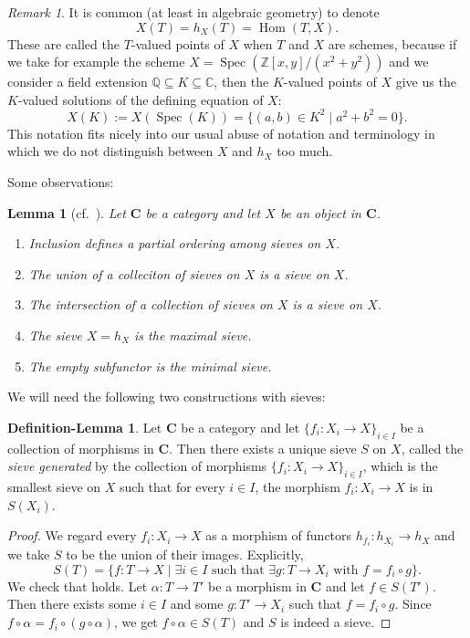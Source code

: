 \documentclass[12pt,reqno,a4paper]{amsart}
\theoremstyle{plain}
\newtheorem{lm}[thm]{Lemma}
\theoremstyle{definition}
\newtheorem{defnlm}[thm]{Definition-Lemma}
\theoremstyle{remark}
\newtheorem{rem}[thm]{Remark}
\begin{document}
\begin{rem}
  It is common (at least in algebraic geometry) to denote
  \[ X(T) = h_{X}(T) = \operatorname{Hom}(T,X). \]
  These are called the $T$-valued points of $X$ when $T$ and $X$ are schemes, because if we take for example the scheme $X = \operatorname{Spec}(\mathbb{Z}[x,y]/(x^{2} + y^{2}))$ and we consider a field extension $\mathbb{Q} \subseteq K \subseteq \mathbb{C}$, then the $K$-valued points of $X$ give us the $K$-valued solutions of the defining equation of $X$:
  \[ X(K) := X(\operatorname{Spec}(K)) = \{ (a,b) \in K^{2} \mid a^{2} + b^{2} = 0\}. \]
  This notation fits nicely into our usual abuse of notation and terminology in which we do not distinguish between $X$ and $h_{X}$ too much.
\end{rem}

Some observations:

\begin{lm}[{cf.~\cite[\href{https://stacks.math.columbia.edu/tag/00YZ}{Tag 00YZ}]{stacks-project}}]
  Let $\mathbf{C}$ be a category and let $X$ be an object in $\mathbf{C}$.
  \begin{enumerate}
    \item Inclusion defines a partial ordering among sieves on $X$.
    \item The union of a colleciton of sieves on $X$ is a sieve on $X$.
    \item The intersection of a collection of sieves on $X$ is a sieve on $X$.
    \item The sieve $X = h_{X}$ is the maximal sieve.
    \item The empty subfunctor is the minimal sieve.
  \end{enumerate}
\end{lm}

We will need the following two constructions with sieves:

\begin{defnlm}\label{defnlm:generated}
  Let $\mathbf{C}$ be a category and let $\{ f_{i} \colon X_{i} \to X \}_{i \in I}$ be a collection of morphisms in $\mathbf{C}$.
  Then there exists a unique sieve $S$ on $X$, called the \textit{sieve generated} by the collection of morphisms $\{ f_{i} \colon X_{i} \to X \}_{i \in I}$, which is the smallest sieve on $X$ such that for every $i \in I$, the morphism $f_{i} \colon X_{i} \to X$ is in $S(X_{i})$.
  \begin{proof}
    We regard every $f_{i} \colon X_{i} \to X$ as a morphism of functors $h_{f_{i}} \colon h_{X_{i}} \to h_{X}$ and we take $S$ to be the union of their images.
    Explicitly,
    \[ S(T) = \{ f \colon T \to X \mid \exists i \in I \text{ such that } \exists g \colon T \to X_{i} \text{ with } f = f_{i} \circ g \}. \]
    We check that  holds.
    Let $\alpha \colon T \to T'$ be a morphism in $\mathbf{C}$ and let $f \in S(T')$.
    Then there exists some $i \in I$ and some $g \colon T' \to X_{i}$ such that $f = f_{i} \circ g$.
    Since $f \circ \alpha = f_{i} \circ (g \circ \alpha)$, we get $f \circ \alpha \in S(T)$ and $S$ is indeed a sieve.
  \end{proof}
\end{defnlm}
\end{document}
